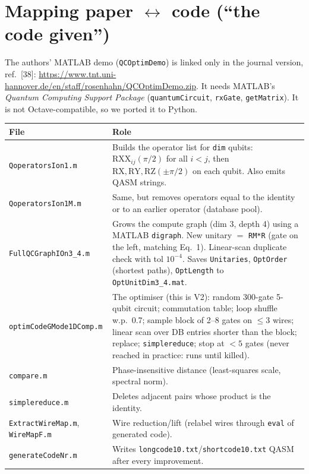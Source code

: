 \documentclass[11pt,a4paper]{article}
\newcommand{\RX}{\mathrm{RX}}\newcommand{\RY}{\mathrm{RY}}\newcommand{\RZ}{\mathrm{RZ}}
\newcommand{\RXX}{\mathrm{RXX}}\newcommand{\CZ}{\mathrm{CZ}}\newcommand{\CNOT}{\mathrm{CNOT}}
\begin{document}
\section{Mapping paper $\leftrightarrow$ code (``the code given'')}
The authors' MATLAB demo (\texttt{QCOptimDemo}) is linked only in the journal version, ref.~[38]:
\url{https://www.tnt.uni-hannover.de/en/staff/rosenhahn/QCOptimDemo.zip}. It needs MATLAB's \emph{Quantum Computing Support Package}
(\texttt{quantumCircuit}, \texttt{rxGate}, \texttt{getMatrix}). It is not Octave-compatible, so we ported it to Python.
\begin{center}\small
\begin{tabular}{p{4.2cm}p{10.6cm}}\toprule
File&Role\\\midrule
\texttt{QoperatorsIon1.m}&Builds the operator list for \texttt{dim} qubits: $\RXX_{ij}(\pi/2)$ for all $i<j$, then
$\RX,\RY,\RZ(\pm\pi/2)$ on each qubit. Also emits QASM strings.\\
\texttt{QoperatorsIon1M.m}&Same, but removes operators equal to the identity or to an earlier operator (database pool).\\
\texttt{FullQCGraphIOn3\_4.m}&Grows the compute graph (dim 3, depth 4) using a MATLAB \texttt{digraph}. New unitary $=$
\texttt{RM*R} (gate on the left, matching Eq.~1). Linear-scan duplicate check with tol $10^{-4}$. Saves
\texttt{Unitaries}, \texttt{OptOrder} (shortest paths), \texttt{OptLength} to \texttt{OptUnitDim3\_4.mat}.\\
\texttt{optimCodeGMode1DComp.m}&The optimiser (this is V2): random 300-gate 5-qubit circuit; commutation table;
loop {shuffle w.p.\ 0.7; sample block of 2--8 gates on $\le3$ wires; linear scan over DB entries shorter than the
block; replace; \texttt{simplereduce}}; stop at $<5$ gates (never reached in practice: runs until killed).\\
\texttt{compare.m}&Phase-insensitive distance (least-squares scale, spectral norm).\\
\texttt{simplereduce.m}&Deletes adjacent pairs whose product is the identity.\\
\texttt{ExtractWireMap.m}, \texttt{WireMapF.m}&Wire reduction/lift (relabel wires through \texttt{eval} of generated code).\\
\texttt{generateCodeNr.m}&Writes \texttt{longcode10.txt}/\texttt{shortcode10.txt} QASM after every improvement.\\\bottomrule
\end{tabular}
\end{center}
\end{document}
